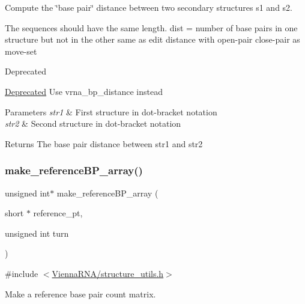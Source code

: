 Compute the \char`\"{}base pair\char`\"{} distance between two secondary structures s1 and s2. 

The sequences should have the same length. dist = number of base pairs in one structure but not in the other same as edit distance with open-\/pair close-\/pair as move-\/set

\begin{DoxyRefDesc}{Deprecated}
\item[\hyperlink{deprecated__deprecated000144}{Deprecated}]Use vrna\+\_\+bp\+\_\+distance instead \end{DoxyRefDesc}

\begin{DoxyParams}{Parameters}
{\em str1} & First structure in dot-\/bracket notation \\
\hline
{\em str2} & Second structure in dot-\/bracket notation \\
\hline
\end{DoxyParams}
\begin{DoxyReturn}{Returns}
The base pair distance between str1 and str2 
\end{DoxyReturn}
\mbox{\label{group__struct__utils_ga578cd9712dee812fb1c58aa3cc489864}} 
\subsubsection{\texorpdfstring{make\+\_\+reference\+B\+P\+\_\+array()}{make\_referenceBP\_array()}}
{\footnotesize\ttfamily unsigned int$\ast$ make\+\_\+reference\+B\+P\+\_\+array (\begin{DoxyParamCaption}\item[{short $\ast$}]{reference\+\_\+pt,  }\item[{unsigned int}]{turn }\end{DoxyParamCaption})}



{\ttfamily \#include $<$\hyperlink{structure__utils_8h}{Vienna\+R\+N\+A/structure\+\_\+utils.\+h}$>$}



Make a reference base pair count matrix. 

